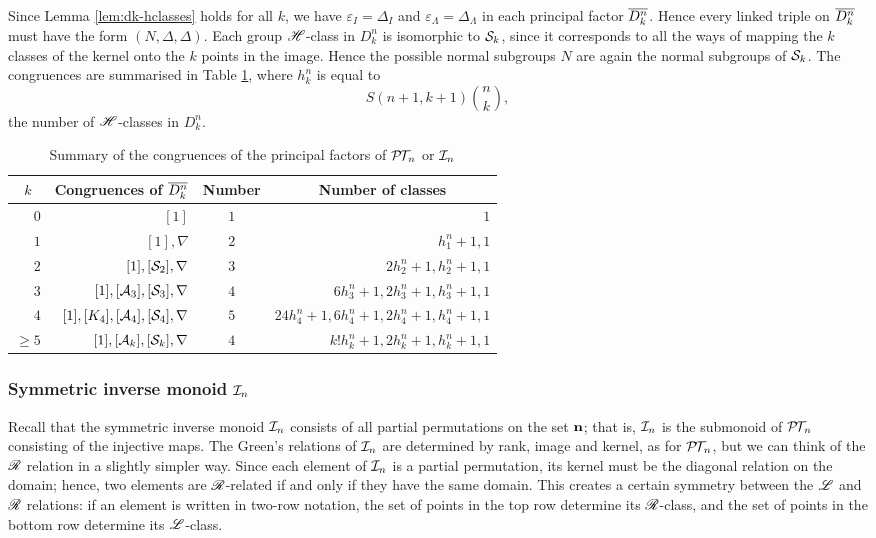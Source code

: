 Since Lemma \ref{lem:dk-hclasses} holds for all $k$, we have
$\varepsilon_I = \Delta_I$ and $\varepsilon_\Lambda = \Delta_\Lambda$ in each
principal factor $\overline{D_k^n}$.  Hence every linked triple on $\overline{D_k^n}$ must
have the form $(N, \Delta, \Delta)$.  Each group $\mathrel{\mathscr{H}}$-class in $D_k^n$ is
isomorphic to $\mathcal{S}_k$, since it corresponds to all the ways of mapping the
$k$ classes of the kernel onto the $k$ points in the image.  Hence the possible
normal subgroups $N$ are again the normal subgroups of $\mathcal{S}_k$.
The congruences are summarised in Table \ref{tab:dkstar-congs-ptn}, where
$h_k^n$ is equal to $$S(n+1, k+1) \binom{n}{k},$$ the number of $\mathrel{\mathscr{H}}$-classes in
$D_k^n$.

\begin{table}[h]
  \centering
  \renewcommand{\arraystretch}{1.3}
  \begin{tabular}{| r | r | c | r |}
    \hline
    \multicolumn{1}{|c|}{$k$} & \multicolumn{1}{c|}{\textbf{Congruences of $\overline{D_k^n}$}} & \textbf{Number} & \multicolumn{1}{c|}{\textbf{Number of classes}} \\
    \hline
    $0$ & $[1]$ & $1$ & $1$ \\
    $1$ & $[1], \nabla$ & $2$ & $h_1^n+1, 1$ \\
    $2$ & $[1], [\mathcal{S}_2], \nabla$ & $3$ & $2h_2^n+1, h_2^n+1, 1$ \\
    $3$ & $[1], [\mathcal{A}_3], [\mathcal{S}_3], \nabla$ & $4$ & $6h_3^n+1, 2h_3^n+1, h_3^n+1, 1$ \\
    $4$ & $[1], [K_4], [\mathcal{A}_4], [\mathcal{S}_4], \nabla$ & $5$ & $24h_4^n+1, 6h_4^n+1, 2h_4^n+1, h_4^n+1, 1$ \\
    $\geq 5$ & $[1], [\mathcal{A}_k], [\mathcal{S}_k], \nabla$ & $4$ & $k!h_k^n+1, 2h_k^n+1, h_k^n+1, 1$ \\
    \hline
  \end{tabular}
  \caption{Summary of the congruences of the principal factors of $\mathcal{P\!T\!}_n$ or
    $\mathcal{I}_n$}
  \label{tab:dkstar-congs-ptn}
\end{table}

\subsubsection{Symmetric inverse monoid $\mathcal{I}_n$}
\label{sec:princfact-in}
Recall that the symmetric inverse monoid $\mathcal{I}_n$ consists of all partial
permutations on the set $\mathbf{n}$; that is, $\mathcal{I}_n$ is the submonoid of $\mathcal{P\!T\!}_n$
consisting of the injective maps.  The Green's relations of $\mathcal{I}_n$ are
determined by rank, image and kernel, as for $\mathcal{P\!T\!}_n$, but we can think of the
$\mathrel{\mathscr{R}}$ relation in a slightly simpler way.  Since each element of $\mathcal{I}_n$ is a
partial permutation, its kernel must be the diagonal relation on the domain;
hence, two elements are $\mathrel{\mathscr{R}}$-related if and only if they have the same domain.
This creates a certain symmetry between the $\mathrel{\mathscr{L}}$ and $\mathrel{\mathscr{R}}$ relations: if an
element is written in two-row notation, the set of points in the top row
determine its $\mathrel{\mathscr{R}}$-class, and the set of points in the bottom row determine its
$\mathrel{\mathscr{L}}$-class.


